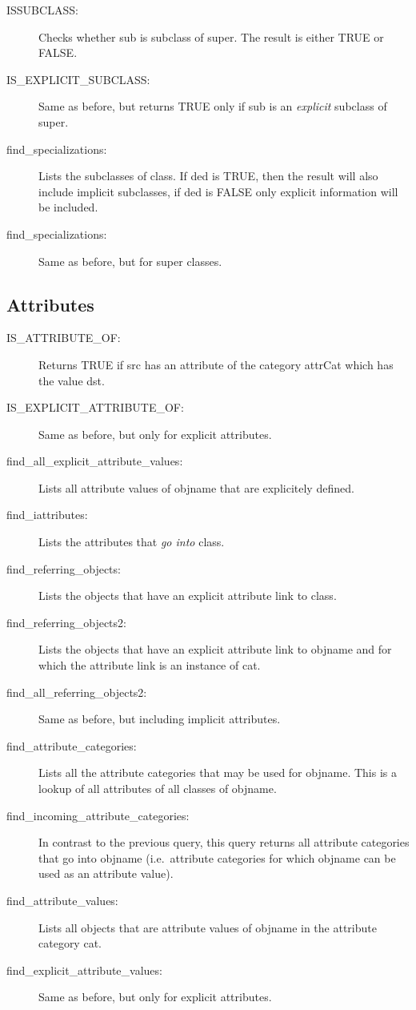 \begin{description}
\item[ISSUBCLASS:] Checks whether {\ttfamily sub} is subclass of {\ttfamily super}.
The result is either {\ttfamily TRUE} or {\ttfamily FALSE}.
\item[IS\_EXPLICIT\_SUBCLASS:] Same as before, but returns {\ttfamily TRUE} only if
{\ttfamily sub} is an {\em explicit} subclass of {\ttfamily super}.
\item[find\_specializations:] Lists the subclasses of {\ttfamily class}. If {\ttfamily ded}
is {\ttfamily TRUE}, then the result will also include implicit subclasses, if
{\ttfamily ded} is {\ttfamily FALSE} only explicit information will be included.
\item[find\_specializations:] Same as before, but for super classes.
\end{description}

\subsection{Attributes}

\begin{description}
\item[IS\_ATTRIBUTE\_OF:] Returns {\ttfamily TRUE} if {\ttfamily src} has an attribute
of the category {\ttfamily attrCat} which has the value {\ttfamily dst}.
\item[IS\_EXPLICIT\_ATTRIBUTE\_OF:] Same as before, but only for explicit attributes.
\item[find\_all\_explicit\_attribute\_values:] Lists all attribute values of {\ttfamily objname}
that are explicitely defined.
\item[find\_iattributes:] Lists the attributes that {\em go into} {\ttfamily class}.
\item[find\_referring\_objects:] Lists the objects that have an explicit attribute link to {\ttfamily class}.
\item[find\_referring\_objects2:] Lists the objects that have an explicit attribute link
to {\ttfamily objname} and for which the attribute link is an instance of {\ttfamily cat}.
\item[find\_all\_referring\_objects2:] Same as before, but including implicit attributes.
\item[find\_attribute\_categories:] Lists all the attribute categories that may be used for
{\ttfamily objname}. This is a lookup of all attributes of all classes of {\ttfamily objname}.
\item[find\_incoming\_attribute\_categories:] In contrast to the previous query, this query returns
all attribute categories that go into {\ttfamily objname} (i.e.\ attribute categories for which
{\ttfamily objname} can be used as an attribute value).
\item[find\_attribute\_values:] Lists all objects that are attribute values of {\ttfamily objname}
in the attribute category {\ttfamily cat}.
\item[find\_explicit\_attribute\_values:] Same as before, but only for explicit attributes.
\end{description}

